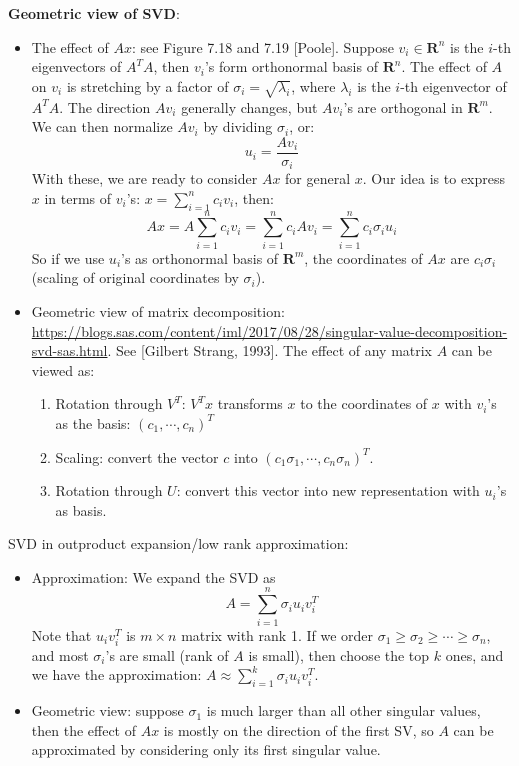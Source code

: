\documentclass{report}
\begin{document}
\textbf{Geometric view of SVD}: 
\begin{itemize}
	\item The effect of $Ax$: see Figure 7.18 and 7.19 [Poole]. Suppose $v_i \in \mathbf{R}^n$ is the $i$-th eigenvectors of $A^T A$, then $v_i$'s form orthonormal basis of $\mathbf{R}^n$. The effect of $A$ on $v_i$ is stretching by a factor of $\sigma_i = \sqrt{\lambda_i}$, where $\lambda_i$ is the $i$-th eigenvector of $A^T A$. The direction $A v_i$ generally changes, but $A v_i$'s are orthogonal in $\mathbf{R}^m$. We can then normalize $A v_i$ by dividing $\sigma_i$, or:
	\begin{equation}
	u_i = \frac{A v_i}{\sigma_i}
	\end{equation}
	With these, we are ready to consider $Ax$ for general $x$. Our idea is to express $x$ in terms of $v_i$'s: $x = \sum_{i=1}^n c_i v_i$, then: 
	\begin{equation}
	A x = A \sum_{i=1}^n c_i v_i = \sum_{i=1}^n c_i A v_i = \sum_{i=1}^n c_i \sigma_i u_i
	\end{equation}
	So if we use $u_i$'s as orthonormal basis of $\mathbf{R}^m$, the coordinates of $Ax$ are $c_i \sigma_i$ (scaling of original coordinates by $\sigma_i$). 
	
	\item Geometric view of matrix decomposition: \url{https://blogs.sas.com/content/iml/2017/08/28/singular-value-decomposition-svd-sas.html}. See [Gilbert Strang, 1993]. The effect of any matrix $A$ can be viewed as:
	\begin{enumerate}
		\item Rotation through $V^T$: $V^T x$ transforms $x$ to the coordinates of $x$ with $v_i$'s as the basis: $(c_1, \cdots, c_n)^T$
		\item Scaling: convert the vector $c$ into $(c_1 \sigma_1, \cdots, c_n \sigma_n)^T$. 
		\item Rotation through $U$: convert this vector into new representation with $u_i$'s as basis. 
	\end{enumerate} 
\end{itemize}
 
SVD in outproduct expansion/low rank approximation: 
\begin{itemize}
	\item Approximation: We expand the SVD as 
	\begin{equation}
	A = \sum_{i=1}^n \sigma_i u_i v_i^T	
	\end{equation}
	Note that $u_i v_i^T$ is $m \times n$ matrix with rank 1. If we order $\sigma_1 \geq \sigma_2 \geq \cdots \geq \sigma_n$, and most $\sigma_i$'s are small (rank of $A$ is small), then choose the top $k$ ones, and we have the approximation: $A \approx \sum_{i=1}^k \sigma_i u_i v_i^T$.
	
	\item Geometric view: suppose $\sigma_1$ is much larger than all other singular values, then the effect of $Ax$ is mostly on the direction of the first SV, so $A$ can be approximated by considering only its first singular value. 
\end{itemize} 
\end{document}
